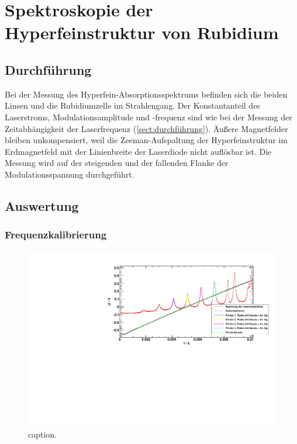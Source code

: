 \section{Spektroskopie der Hyperfeinstruktur von Rubidium}
\subsection{Durchführung}
Bei der Messung des Hyperfein-Absorptionsspektrums befinden sich die beiden Linsen und
die Rubidiumzelle im Strahlengang.
Der Konstantanteil des Laserstroms, Modulationsamplitude und -frequenz
sind wie bei der Messung der Zeitabhängigkeit der Laserfrequenz (\autoref{sect:durchführung}).
Äußere Magnetfelder bleiben unkompensiert, weil die Zeeman-Aufspaltung der Hyperfeinstruktur im Erdmagnetfeld
mit der Linienbreite der Laserdiode nicht auflösbar ist.
Die Messung wird auf der steigenden und der fallenden Flanke der Modulationsspannung durchgeführt.


\subsection{Auswertung}
\subsubsection*{Frequenzkalibrierung}
\begin{figure}[H]
\begin{center}
  \includegraphics[width=\textwidth]{../img/part2/up-etalon_zoom_fit.pdf}
  \caption{caption.}
  \label{img:etalon:fit:up}
\end{center}
\end{figure}


